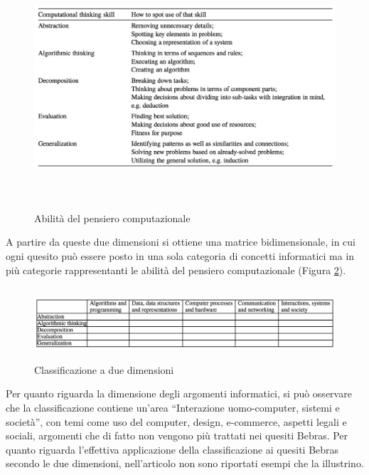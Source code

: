 \documentclass[12pt]{report}
\begin{document}
\begin{figure}[H]
	\centering
	\includegraphics[height=9cm]{./immagini/01_Cap1/CTDagiene}
	\caption{Abilità del pensiero computazionale \cite{DagieneINFORMATICA2017}}\label{CTDagiene}
\end{figure}

A partire da queste due dimensioni si ottiene una matrice bidimensionale, in cui ogni quesito può essere posto in una sola categoria di concetti informatici ma in più categorie rappresentanti le abilità del pensiero computazionale (Figura \ref{TwoDimension}).
\begin{figure}[H]
	\centering
	\includegraphics[height=2.7cm]{./immagini/01_Cap1/two-dimensional_classification}
	\caption{Classificazione a due dimensioni \cite{DagieneINFORMATICA2017}}\label{TwoDimension}
\end{figure}

Per quanto riguarda la dimensione degli argomenti informatici, si può osservare che la classificazione contiene un'area ``Interazione uomo-computer, sistemi e società'', con temi come uso del computer, design, e-commerce, aspetti legali e sociali, argomenti che di fatto non vengono più trattati nei quesiti Bebras. Per quanto riguarda l'effettiva applicazione della classificazione ai quesiti Bebras secondo le due dimensioni, nell'articolo non sono riportati esempi che la illustrino.
\end{document}
